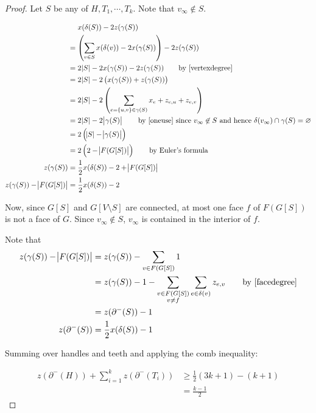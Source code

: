 \documentclass{memoir}
\theoremstyle{plain}
\theoremstyle{definition}
\begin{document}
\begin{proof}
Let $S$ be any of $H, T_1,\cdots, T_k$. Note that $v_\infty\not\in S$.

\begin{align*}
&\phantom{{}={}} x(\delta(S)) - 2z(\gamma(S)) \\ 
&= \del{\sum_{v\in S} x(\delta(v)) - 2x(\gamma(S))} - 2z(\gamma(S))\\
&= 2\abs{S} - 2x(\gamma(S)) - 2z(\gamma(S)) \tag*{by \eqref{vertexdegree}} \\
&= 2\abs{S} - 2\del{x(\gamma(S)) + z(\gamma(S))} \\
&= 2\abs{S} - 2\del{\sum_{e = \cbr{u,v}\in \gamma(S)} x_e + z_{e,u} + z_{e,v} } \\
&= 2\abs{S} - 2\abs{\gamma(S)} \tag*{by \eqref{oneuse} since $v_\infty\not\in S$ and hence $\delta(v_\infty)\cap \gamma(S) = \varnothing$} \\
&= 2\del{\abs{S}-\abs{\gamma(S)}} \\
&= 2\del{2 - \abs{F(G[S])}} \tag*{by Euler's formula} \\ 
z(\gamma(S)) &= \frac{1}{2}x(\delta(S)) - 2 + \abs{F(G[S])} \\
z(\gamma(S)) - \abs{F(G[S])} &= \frac{1}{2}x(\delta(S)) - 2
\end{align*}

Now, since $G[S]$ and $G[V\setminus S]$ are connected, at most one face $f$ of $F(G[S])$ is not a face of $G$. Since $v_\infty\not\in S$, $v_\infty$ is contained in the interior of $f$.

Note that
\begin{align*}
z(\gamma(S)) - \abs{F(G[S])} &= z(\gamma(S)) - \sum_{v \in F(G[S])} 1 \\
&= z(\gamma(S)) - 1 - \sum_{\substack{v \in F(G[S]) \\ v\neq f}} \sum_{e\in\delta(v)} z_{e,v} \tag*{by \eqref{facedegree}} \\
&= z(\partial^-(S)) - 1 \\
z(\partial^-(S)) &= \frac{1}{2}x(\delta(S)) - 1
\end{align*}

Summing over handles and teeth and applying the comb inequality:

\begin{align*}
z(\partial^-(H)) + \sum_{i=1}^k z(\partial^-(T_i)) &\geq \frac{1}{2}(3k+1) - (k+1) \\
&= \frac{k-1}{2}
\end{align*}
\end{proof}
\end{document}
